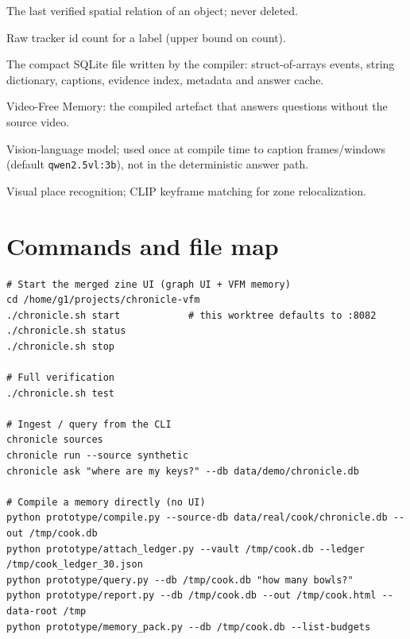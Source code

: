 \documentclass[10pt,a4paper]{article}
\newcommand{\code}[1]{\texttt{\small #1}}
\begin{document}
\begin{description}[leftmargin=1.55em,itemsep=1pt,topsep=1pt,style=nextline]
  \item[Terminal anchor] The last verified spatial relation of an object; never deleted.
  \item[Track] Raw tracker id count for a label (upper bound on count).
  \item[Vault] The compact SQLite file written by the compiler: struct-of-arrays events, string
        dictionary, captions, evidence index, metadata and answer cache.
  \item[VFM] Video-Free Memory: the compiled artefact that answers questions without the source video.
  \item[VLM] Vision-language model; used once at compile time to caption frames/windows
        (default \code{qwen2.5vl:3b}), not in the deterministic answer path.
  \item[VPR] Visual place recognition; CLIP keyframe matching for zone relocalization.
\end{description}

\section{Commands and file map}

\begin{verbatim}
# Start the merged zine UI (graph UI + VFM memory)
cd /home/g1/projects/chronicle-vfm
./chronicle.sh start            # this worktree defaults to :8082
./chronicle.sh status
./chronicle.sh stop

# Full verification
./chronicle.sh test

# Ingest / query from the CLI
chronicle sources
chronicle run --source synthetic
chronicle ask "where are my keys?" --db data/demo/chronicle.db

# Compile a memory directly (no UI)
python prototype/compile.py --source-db data/real/cook/chronicle.db --out /tmp/cook.db
python prototype/attach_ledger.py --vault /tmp/cook.db --ledger /tmp/cook_ledger_30.json
python prototype/query.py --db /tmp/cook.db "how many bowls?"
python prototype/report.py --db /tmp/cook.db --out /tmp/cook.html --data-root /tmp
python prototype/memory_pack.py --db /tmp/cook.db --list-budgets
\end{verbatim}
\end{document}
